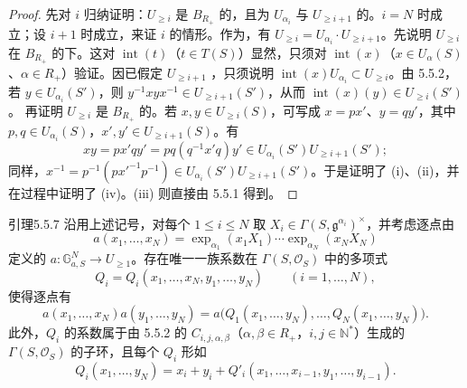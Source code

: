 \begin{proof}
先对 $i$ 归纳证明：$U_{\ge i}$ 是 $B_{R_+}$ 的，且为 $U_{\alpha_i}$ 与 $U_{\ge i+1}$ 的。$i=N$ 时成立；设 $i+1$ 时成立，来证 $i$ 的情形。作为，有 $U_{\ge i}=U_{\alpha_i}\cdot U_{\ge i+1}$。先说明 $U_{\ge i}$ 在 $B_{R_+}$ 的下。这对 $\operatorname{int}(t)$（$t\in T(S)$）显然，只须对 $\operatorname{int}(x)$（$x\in U_\alpha(S)$、$\alpha\in R_+$）验证。因已假定 $U_{\ge i+1}$ ，只须说明 $\operatorname{int}(x)U_{\alpha_i}\subset U_{\ge i}$。由 5.5.2，若 $y\in U_{\alpha_i}(S')$，则 $y^{-1}xyx^{-1}\in U_{\ge i+1}(S')$，从而 $\operatorname{int}(x)(y)\in U_{\ge i}(S')$。
再证明 $U_{\ge i}$ 是 $B_{R_+}$ 的。若 $x,y\in U_{\ge i}(S)$，可写成 $x=px'$、$y=qy'$，其中 $p,q\in U_{\alpha_i}(S)$，$x',y'\in U_{\ge i+1}(S)$。有
\[xy=px'qy'=pq(q^{-1}x'q)y'\in U_{\alpha_i}(S')U_{\ge i+1}(S');\]
同样，$x^{-1}=p^{-1}(px'^{-1}p^{-1})\in U_{\alpha_i}(S')U_{\ge i+1}(S')$。于是证明了 (i)、(ii)，并在过程中证明了 (iv)。(iii) 则直接由 5.5.1 得到。
\end{proof}
\begin{SGAresult}{引理}{5.5.7}
沿用上述记号，对每个 $1\le i\le N$ 取 $X_i\in\Gamma(S,\mathfrak g^{\alpha_i})^\times$，并考虑逐点由
\[a(x_1,\ldots,x_N)=\exp_{\alpha_1}(x_1X_1)\cdots\exp_{\alpha_N}(x_NX_N)\]
定义的 $a:\mathbb G_{a,S}^N\to U_{\ge1}$。存在唯一一族系数在 $\Gamma(S,\mathcal O_S)$ 中的多项式
\[Q_i=Q_i(x_1,\ldots,x_N,y_1,\ldots,y_N)\qquad(i=1,\ldots,N),\]
使得逐点有
\[a(x_1,\ldots,x_N)a(y_1,\ldots,y_N)=a\bigl(Q_1(x_1,\ldots,y_N),\ldots,Q_N(x_1,\ldots,y_N)\bigr).\]
此外，$Q_i$ 的系数属于由 5.5.2 的 $C_{i,j,\alpha,\beta}$（$\alpha,\beta\in R_+$，$i,j\in\mathbb N^*$）生成的 $\Gamma(S,\mathcal O_S)$ 的子环，且每个 $Q_i$ 形如
\[Q_i(x_1,\ldots,y_N)=x_i+y_i+Q'_i(x_1,\ldots,x_{i-1},y_1,\ldots,y_{i-1}).\]
\end{SGAresult}
